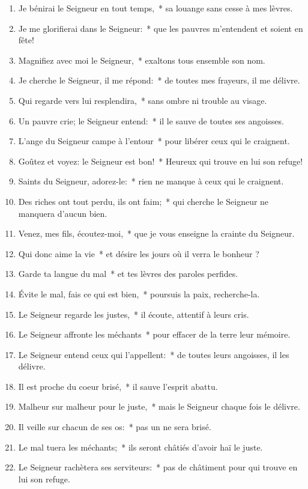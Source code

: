 \documentclass[twoside]{article}
\begin{document}
\begin{paracol}[1]{2}
\begin{enumerate}[wide, itemsep=0mm, labelwidth=!, labelindent=0pt, label=\color{gregoriocolor}\theenumi]
\item Je bénirai le Seigneur en tout temps,~* sa louange sans cesse à mes lèvres.
\item Je me glorifierai dans le Seigneur:~* que les pauvres m'entendent et soient en fête!
\item Magnifiez avec moi le Seigneur,~* exaltons tous ensemble son nom.
\item Je cherche le Seigneur, il me répond:~* de toutes mes frayeurs, il me délivre.
\item Qui regarde vers lui resplendira,~* sans ombre ni trouble au visage.
\item Un pauvre crie; le Seigneur entend:~* il le sauve de toutes ses angoisses.
\item L'ange du Seigneur campe à l'entour~* pour libérer ceux qui le craignent.
\item Goûtez et voyez: le Seigneur est bon!~* Heureux qui trouve en lui son refuge!
\item Saints du Seigneur, adorez-le:~* rien ne manque à ceux qui le craignent.
\item Des riches ont tout perdu, ils ont faim;~* qui cherche le Seigneur ne manquera d'aucun bien.
\item Venez, mes fils, écoutez-moi,~* que je vous enseigne la crainte du Seigneur.
\item Qui donc aime la vie~* et désire les jours où il verra le bonheur ?
\item Garde ta langue du mal~* et tes lèvres des paroles perfides.
\item Évite le mal, fais ce qui est bien,~* poursuis la paix, recherche-la.
\item Le Seigneur regarde les justes,~* il écoute, attentif à leurs cris.
\item Le Seigneur affronte les méchants~* pour effacer de la terre leur mémoire.
\item Le Seigneur entend ceux qui l'appellent:~* de toutes leurs angoisses, il les délivre.
\item Il est proche du coeur brisé,~* il sauve l'esprit abattu.
\item Malheur sur malheur pour le juste,~* mais le Seigneur chaque fois le délivre.
\item Il veille sur chacun de ses os:~* pas un ne sera brisé.
\item Le mal tuera les méchants;~* ils seront châtiés d'avoir haï le juste.
\item Le Seigneur rachètera ses serviteurs:~* pas de châtiment pour qui trouve en lui son refuge.
\end{enumerate}


\end{paracol}
\end{document}

